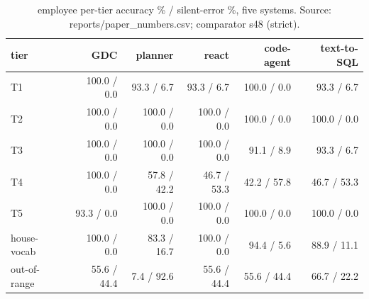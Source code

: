 \begin{table}[t]
\centering
\caption{employee per-tier accuracy \% / silent-error \%, five systems. Source: reports/paper\_numbers.csv; comparator s48 (strict).}
\label{tab:table1_employee}
\begin{tabular}{lrrrrr}
\toprule
tier & GDC & planner & react & code-agent & text-to-SQL \\
\midrule
T1 & 100.0 / 0.0 & 93.3 / 6.7 & 93.3 / 6.7 & 100.0 / 0.0 & 93.3 / 6.7 \\
T2 & 100.0 / 0.0 & 100.0 / 0.0 & 100.0 / 0.0 & 100.0 / 0.0 & 100.0 / 0.0 \\
T3 & 100.0 / 0.0 & 100.0 / 0.0 & 100.0 / 0.0 & 91.1 / 8.9 & 93.3 / 6.7 \\
T4 & 100.0 / 0.0 & 57.8 / 42.2 & 46.7 / 53.3 & 42.2 / 57.8 & 46.7 / 53.3 \\
T5 & 93.3 / 0.0 & 100.0 / 0.0 & 100.0 / 0.0 & 100.0 / 0.0 & 100.0 / 0.0 \\
house-vocab & 100.0 / 0.0 & 83.3 / 16.7 & 100.0 / 0.0 & 94.4 / 5.6 & 88.9 / 11.1 \\
out-of-range & 55.6 / 44.4 & 7.4 / 92.6 & 55.6 / 44.4 & 55.6 / 44.4 & 66.7 / 22.2 \\
\bottomrule
\end{tabular}
\end{table}
